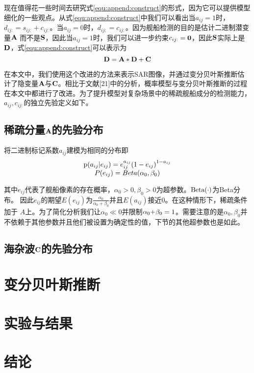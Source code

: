 现在值得花一些时间去研究式\ref{equ:append:construct}的形式，因为它可以提供模型细化的一些观点。从式\ref{equ:append:construct}中我们可以看出当$a_{ij}=1$时，$d_{ij:}=s_{ij:}+c_{ij:}$。当$a_{ij}=0$时，$d_{ij:}=c_{ij:}$。因为舰船检测的目的是估计二进制潜变量$\bf{A}$
而不是$\bf{S}$，因此当$a_{ij}=1$时，我们可以进一步约束$c_{ij:}=\bf{0}$，因此$\bf{S}$实际上是$\bf{D}$，式\ref{equ:append:construct}可以表示为
\begin{equation}
   \label{equ:append:refine}
   {\bf{D = A*D + C}} 
\end{equation}

在本文中，我们使用这个改进的方法来表示SAR图像，并通过变分贝叶斯推断估计了隐变量$\bf{A}$与$\bf{C}$。相比于文献[21]中的分析，概率模型与变分贝叶斯推断的过程在本文中都进行了改进。为了提升模型对复杂场景中的稀疏舰船成分的检测能力，$a_{ij},c_{ij:}$的独立先验定义如下。
\subsection{稀疏分量$\bf{A}$的先验分布}
将二进制标记系数$a_{ij}$建模为相同的分布即
    \begin{equation}
        \label{equ:append:priora}
        \begin{array}{*{20}{c}}
        {{\rm{p}}({a_{ij}}|{e_{ij}}) = e_{ij}^{{a_{ij}}}{{(1 - {e_{ij}})}^{1 - {a_{ij}}}}}\\
        {P({e_{ij}}) = Beta({\alpha _0},{\beta _0})}
        \end{array}
    \end{equation}

其中$e_{ij}$代表了舰船像素的存在概率，$\alpha_0>0, \beta_0>0$为超参数。$\rm{Beta(\cdot)}$为Beta分布。
因此$e_{ij}$的期望$E(e_{ij})$为$\frac{{{\alpha _0}}}{{{\alpha _0} + {\beta _0}}}$并且$E(a_{ij})$接近0。在这种情形下，稀疏条件加于
$A$上。为了简化分析我们让${\alpha _0} \ll 0$并限制${\alpha _0}{\rm{ + }}{\beta _0} = 1$。需要注意的是$\alpha_0,\beta_0$并不依赖于其他参数并且他们被设置为确定性的值，下节的其他超参数也是如此。

\subsection{海杂波$\bf{C}$的先验分布}
\section{变分贝叶斯推断}
\section{实验与结果}
\section{结论}

